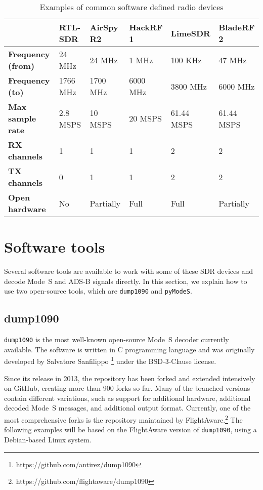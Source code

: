 \begin{table}[ht]
  \footnotesize
  \caption{Examples of common software defined radio devices}
  \label{tb:sdr}
  \begin{tabular}{|l|l|l|l|l|l|}
  \hline
   & \textbf{RTL-SDR} & \textbf{AirSpy R2} & \textbf{HackRF 1} & \textbf{LimeSDR} & \textbf{BladeRF 2} \\ \hline
  \textbf{Frequency (from)} & 24 MHz & 24 MHz & 1 MHz & 100 KHz & 47 MHz \\ \hline
  \textbf{Frequency (to)} & 1766 MHz & 1700 MHz & 6000 MHz & 3800 MHz & 6000 MHz \\ \hline
  \textbf{Max sample rate} & 2.8 MSPS & 10 MSPS & 20 MSPS & 61.44 MSPS & 61.44 MSPS \\ \hline
  \textbf{RX channels} & 1 & 1 & 1 & 2 & 2 \\ \hline
  \textbf{TX channels} & 0 & 1 & 1 & 2 & 2 \\ \hline
  \textbf{Open hardware} & No & Partially & Full & Full & Partially \\ \hline
  \end{tabular}
\end{table}

\section{Software tools}

Several software tools are available to work with some of these SDR devices and decode Mode~S and ADS-B signals directly. In this section, we explain how to use two open-source tools, which are \texttt{dump1090} and \texttt{pyModeS}.

\subsection{dump1090}

\texttt{dump1090} is the most well-known open-source Mode~S decoder currently available. The software is written in C programming language and was originally developed by Salvatore Sanfilippo \footnote{https://github.com/antirez/dump1090} under the BSD-3-Clause license.

Since its release in 2013, the repository has been forked and extended intensively on GitHub, creating more than 900 forks so far. Many of the branched versions contain different variations, such as support for additional hardware, additional decoded Mode~S messages, and additional output format. Currently, one of the most comprehensive forks is the repository maintained by FlightAware.\footnote{https://github.com/flightaware/dump1090} The following examples will be based on the FlightAware version of \texttt{dump1090}, using a Debian-based Linux system.

